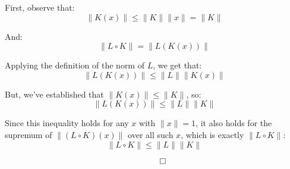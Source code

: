 \documentclass[12]{amsart}
\theoremstyle{definition}
\newcommand{\norm}[1]{\lVert#1\rVert}
\begin{document}
First, observe that:
\[\norm{K(x)} \leq \norm{K} \norm{x} = \norm{K}\]

And:
\[\norm{L\circ K} = \norm{L(K(x))}\]

Applying the definition of the norm of $L$, we get that:
\[\norm{L(K(x))} \leq \norm{L} \norm{K(x)}\]

But, we've established that $\norm{K(x)} \leq \norm{K}$, so:
\[\norm{L(K(x))} \leq \norm{L} \norm{K}\]

Since this inequality holds for any $x$ with $\norm{x} = 1$, it also
holds for the supremum of $\norm{(L\circ K)(x)}$ over all such $x$,
which is exactly $\norm{L\circ K}$:
\[\norm{L\circ K} \leq \norm{L} \norm{K}\]

\[\qed\]
\end{document}
